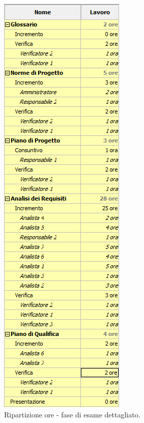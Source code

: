 \documentclass[a4paper]{article}
\begin{document}
				\begin{figure}[H]
					\centering
					\includegraphics[width=\textwidth]{ro_dettaglio}
					\caption{Ripartizione ore - fase di esame dettagliato.}
				\end{figure}
				
\end{document}
